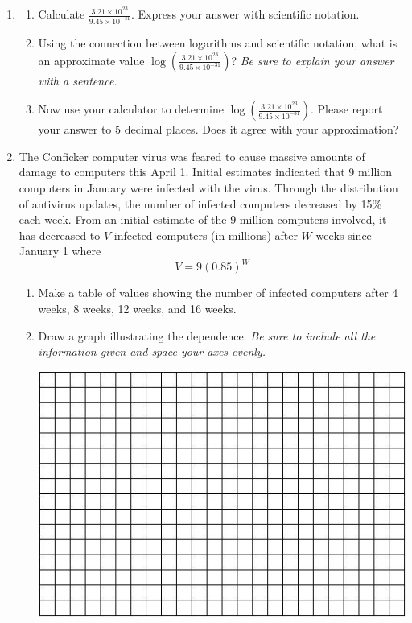 \documentclass[12pt]{article}
\begin{document}
\newpage
\begin{enumerate}

\item \begin{enumerate}
\item Calculate $\displaystyle \frac{3.21 \times 10^{23}}{9.45 \times 10^{-31}} $. Express your answer with scientific notation.
\vfill
\item Using the connection between logarithms and scientific notation, what is an approximate value $\displaystyle \log \left( \frac{3.21 \times 10^{23}}{9.45 \times 10^{-31}} \right)$?  \emph{Be sure to explain your answer with a sentence.}
\vfill
\item Now use your calculator to determine  $\displaystyle \log \left(\frac{3.21 \times 10^{23}}{9.45 \times 10^{-31}}  \right)$. Please report your answer to 5 decimal places.  Does it agree with your approximation?
\vfill
\end{enumerate}

\newpage


\item The Conficker computer virus was feared to cause massive amounts of damage to computers this April 1.  Initial estimates indicated that 9 million computers in January were infected with the virus.  Through the distribution of antivirus updates, the number of infected computers decreased by 15\% each week.  From an initial estimate of the 9 million computers involved, it has decreased to $V$ infected computers (in millions) after $W$ weeks since January 1 where $$V = 9(0.85)^W$$

\begin{enumerate}
\item Make a table of values showing the number of infected computers after 4 weeks, 8 weeks, 12 weeks, and 16 weeks.
\vfill
\item Draw a graph illustrating the dependence.  \emph{Be sure to include all the information given and space your axes evenly.}

\vspace{.1in}
\begin{center}
 {\includegraphics [width = 6in] {../GraphPaper}}
\end{center}
\vspace{.1in}


\end{enumerate}
\end{enumerate}
\end{document}
